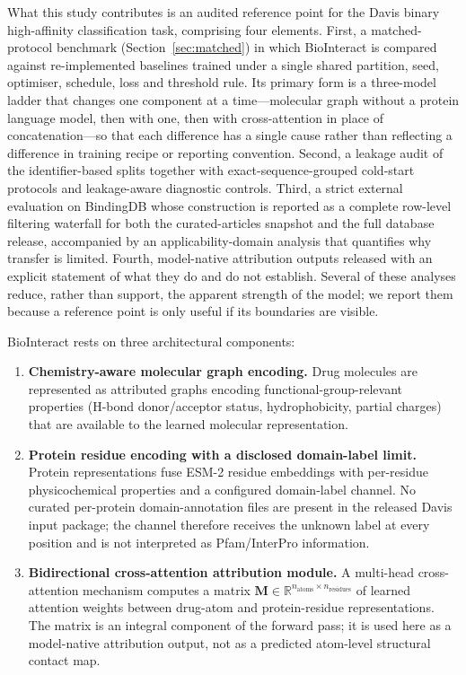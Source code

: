 \documentclass[fleqn,10pt]{wlscirep}
\begin{document}
What this study contributes is an audited reference point for the Davis binary
high-affinity classification task, comprising four elements.  First, a
matched-protocol benchmark (Section~\ref{sec:matched}) in which BioInteract is
compared against re-implemented baselines trained under a single shared
partition, seed, optimiser, schedule, loss and threshold rule.  Its primary form
is a three-model ladder that changes one component at a time---molecular graph
without a protein language model, then with one, then with cross-attention in
place of concatenation---so that each difference has a single cause rather than
reflecting a difference in training recipe or reporting convention.  Second, a leakage audit of the identifier-based
splits together with exact-sequence-grouped cold-start protocols and
leakage-aware diagnostic controls.  Third, a strict external evaluation on
BindingDB whose construction is reported as a complete row-level filtering
waterfall for both the curated-articles snapshot and the full database release,
accompanied by an applicability-domain analysis that quantifies why transfer is
limited.  Fourth, model-native attribution outputs released with an explicit
statement of what they do and do not establish.  Several of these analyses
reduce, rather than support, the apparent strength of the model; we report them
because a reference point is only useful if its boundaries are visible.

BioInteract rests on three architectural components:

\begin{enumerate}[leftmargin=*]
\item \textbf{Chemistry-aware molecular graph encoding.}  Drug molecules are
  represented as attributed graphs encoding functional-group-relevant properties
  (H-bond donor/acceptor status, hydrophobicity, partial charges) that
  are available to the learned molecular representation.

\item \textbf{Protein residue encoding with a disclosed domain-label limit.}
  Protein representations fuse ESM-2 residue embeddings with per-residue
  physicochemical properties and a configured domain-label channel. No curated
  per-protein domain-annotation files are present in the released Davis input
  package; the channel therefore receives the unknown label at every position
  and is not interpreted as Pfam/InterPro information.

\item \textbf{Bidirectional cross-attention attribution module.}  A multi-head
  cross-attention mechanism computes a matrix
  $\mathbf{M} \in \mathbb{R}^{n_\text{atoms} \times n_\text{residues}}$ of
  learned attention weights between drug-atom and protein-residue
  representations.  The matrix is an integral component of the forward pass;
  it is used here as a model-native attribution output, not as a predicted
  atom-level structural contact map.
\end{enumerate}
\end{document}

